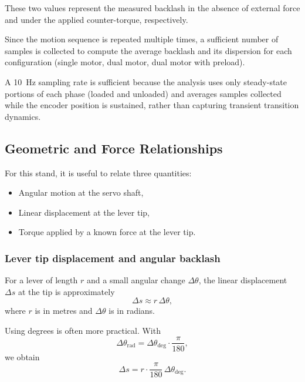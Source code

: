 \documentclass[11pt,letterpaper]{article}
\begin{document}
These two values represent the measured backlash in the absence of external force and under the applied counter-torque, respectively.

Since the motion sequence is repeated multiple times, a sufficient number of samples is collected to compute the average backlash and its dispersion for each configuration (single motor, dual motor, dual motor with preload).

A 10~Hz sampling rate is sufficient because the analysis uses only steady-state portions of each phase (loaded and unloaded) and averages samples collected while the encoder position is sustained, rather than capturing transient transition dynamics.

\subsection{Geometric and Force Relationships}
\label{subsec:geometry}

For this stand, it is useful to relate three quantities:
\begin{itemize}
    \item Angular motion at the servo shaft,
    \item Linear displacement at the lever tip,
    \item Torque applied by a known force at the lever tip.
\end{itemize}

\subsubsection{Lever tip displacement and angular backlash}
\label{subsubsec:lever-backlash}

For a lever of length $r$ and a small angular change $\Delta\theta$, the linear displacement $\Delta s$ at the tip is approximately
\begin{equation}
    \Delta s \approx r \,\Delta\theta,
\end{equation}
where $r$ is in metres and $\Delta\theta$ is in radians.

Using degrees is often more practical. With
\begin{equation}
    \Delta\theta_{\text{rad}} = \Delta\theta_{\text{deg}} \cdot \frac{\pi}{180},
\end{equation}
we obtain
\begin{equation}
    \Delta s = r \cdot \frac{\pi}{180} \,\Delta\theta_{\text{deg}}.
\end{equation}
\end{document}

